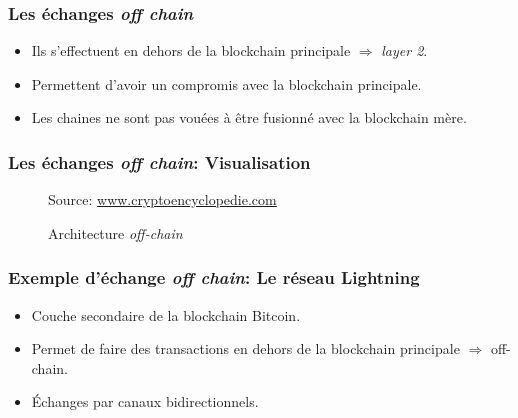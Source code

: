 \begin{frame}
	\frametitle{Les échanges \textit{off chain}}
	\begin{itemize}
		\item Ils s'effectuent en dehors de la blockchain principale $\Rightarrow$ \textit{layer 2}.
		\item Permettent d'avoir un compromis avec la blockchain principale.
		\item Les chaines ne sont pas vouées à être fusionné avec la blockchain mère.
	\end{itemize}
\end{frame}

\begin{frame}
	\frametitle{Les échanges \textit{off chain}: Visualisation}
	\begin{figure}[h!]
		\centering
		{\scriptsize Source: \url{www.cryptoencyclopedie.com}}
		\caption{Architecture \textit{off-chain}}
		\label{fig:offchain}
	\end{figure}
\end{frame}


\begin{frame}
	\frametitle{Exemple d'échange \textit{off chain}: Le réseau Lightning}
	\begin{itemize}
		\item Couche secondaire de la blockchain Bitcoin. \newline
		\item Permet de faire des transactions en dehors de la blockchain principale $\Rightarrow$ off-chain. \newline
		\item Échanges par canaux bidirectionnels.
	\end{itemize}
\end{frame}


